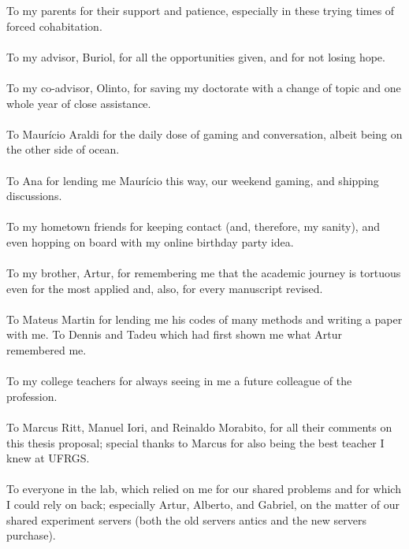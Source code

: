 \documentclass[ppgc,tese,english,formais,babel]{iiufrgs}
\begin{document}
\noindent
To my parents for their support and patience, especially in these trying times of forced cohabitation.\\\\
To my advisor, Buriol, for all the opportunities given, and for not losing hope.\\\\
To my co-advisor, Olinto, for saving my doctorate with a change of topic and one whole year of close assistance.\\\\
To Maurício Araldi for the daily dose of gaming and conversation, albeit being on the other side of ocean.\\\\
To Ana for lending me Maurício this way, our weekend gaming, and shipping discussions.\\\\
To my hometown friends for keeping contact (and, therefore, my sanity), and even hopping on board with my online birthday party idea.\\\\
To my brother, Artur, for remembering me that the academic journey is tortuous even for the most applied and, also, for every manuscript revised.\\\\
To Mateus Martin for lending me his codes of many methods and writing a paper with me.
To Dennis and Tadeu which had first shown me what Artur remembered me.\\\\
To my college teachers for always seeing in me a future colleague of the profession.\\\\
To Marcus Ritt, Manuel Iori, and Reinaldo Morabito, for all their comments on this thesis proposal; special thanks to Marcus for also being the best teacher I knew at UFRGS.\\\\
To everyone in the lab, which relied on me for our shared problems and for which I could rely on back; especially Artur, Alberto, and Gabriel, on the matter of our shared experiment servers (both the old servers antics and the new servers purchase).\\\\
\end{document}
